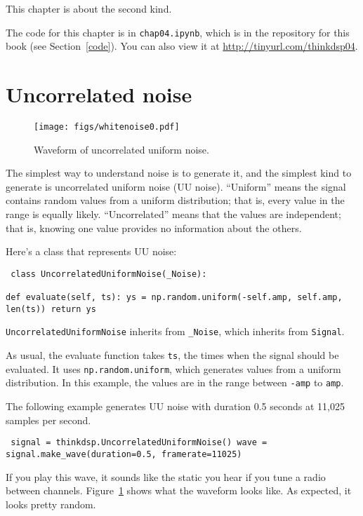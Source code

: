 \documentclass[12pt]{book} \usepackage[width=5.5in,height=8.5in, hmarginratio=3:2,vmarginratio=1:1]{geometry}
\begin{document}
This chapter is about the second kind. 

The code for this chapter is in {\tt chap04.ipynb}, which is in the repository for this book (see Section~\ref{code}). You can also view it at \url{http://tinyurl.com/thinkdsp04}. 

\section{Uncorrelated noise} 

\begin{figure} 

\centerline{\texttt{[image: figs/whitenoise0.pdf]}} \caption{Waveform of uncorrelated uniform noise.} \label{fig.whitenoise0} \end{figure} 

The simplest way to understand noise is to generate it, and the simplest kind to generate is uncorrelated uniform noise (UU noise). ``Uniform'' means the signal contains random values from a uniform distribution; that is, every value in the range is equally likely. ``Uncorrelated'' means that the values are independent; that is, knowing one value provides no information about the others. 

Here's a class that represents UU noise: 

\begin{verbatim} class UncorrelatedUniformNoise(_Noise): 

def evaluate(self, ts): ys = np.random.uniform(-self.amp, self.amp, len(ts)) return ys \end{verbatim} 

{\tt UncorrelatedUniformNoise} inherits from \verb"_Noise", which inherits from {\tt Signal}. 

As usual, the evaluate function takes {\tt ts}, the times when the signal should be evaluated. It uses {\tt np.random.uniform}, which generates values from a uniform distribution. In this example, the values are in the range between {\tt -amp} to {\tt amp}. 

The following example generates UU noise with duration 0.5 seconds at 11,025 samples per second. 

\begin{verbatim} signal = thinkdsp.UncorrelatedUniformNoise() wave = signal.make_wave(duration=0.5, framerate=11025) \end{verbatim} 

If you play this wave, it sounds like the static you hear if you tune a radio between channels. Figure~\ref{fig.whitenoise0} shows what the waveform looks like. As expected, it looks pretty random. 
\end{document}
